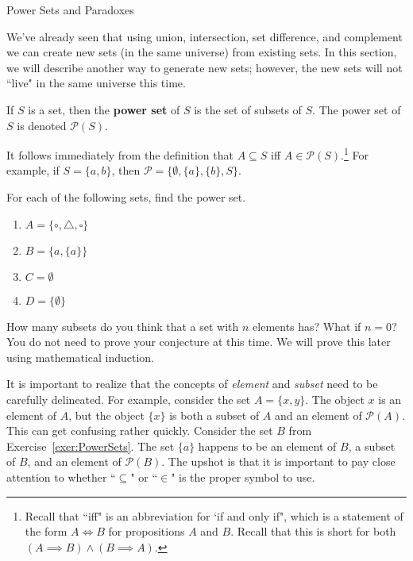 \begin{section}{Power Sets and Paradoxes}\label{sec:PowerSets}

We've already seen that using union, intersection, set difference, and complement we can create new sets (in the same universe) from existing sets.  In this section, we will describe another way to generate new sets; however, the new sets will not ``live" in the same universe this time.

\begin{definition}
If $S$ is a set, then the \textbf{power set} of $S$ is the set of subsets of $S$.  The power set of $S$ is denoted $\boxed{\mathcal{P}(S)}$.
\end{definition}

It follows immediately from the definition that $A\subseteq S$ iff $A\in\mathcal{P}(S)$.\footnote{Recall that ``iff" is an abbreviation for `if and only if", which is a statement of the form $A\iff B$ for propositions $A$ and $B$. Recall that this is short for both $(A\implies B) \wedge (B\implies A)$.}  For example, if $S=\{a,b\}$, then $\mathcal{P}=\{\emptyset, \{a\}, \{b\}, S\}$.

\begin{exercise}\label{exer:PowerSets}
For each of the following sets, find the power set.
\begin{multicols}{2}
\begin{enumerate}[label=\textrm{(\alph*)}]
\item $A=\{\circ, \triangle, \square\}$
\item $B=\{a,\{a\}\}$
\item $C=\emptyset$
\item $D=\{\emptyset\}$
\end{enumerate}
\end{multicols}
\end{exercise}

\begin{conjecture}\label{conjecture:PowerSets}
How many subsets do you think that a set with $n$ elements has?  What if $n=0$?  You do not need to prove your conjecture at this time.  We will prove this later using mathematical induction.
\end{conjecture}


It is important to realize that the concepts of \emph{element} and \emph{subset} need to be carefully delineated.  For example, consider the set $A=\{x,y\}$.  The object $x$ is an element of $A$, but the object $\{x\}$ is both a subset of $A$ and an element of $\mathcal{P}(A)$.  This can get confusing rather quickly.  Consider the set $B$ from Exercise~\ref{exer:PowerSets}.  The set $\{a\}$ happens to be an element of $B$, a subset of $B$, and an element of  $\mathcal{P}(B)$. The upshot is that it is important to pay close attention to whether ``$\subseteq$" or ``$\in$" is the proper symbol to use.


\end{section}
